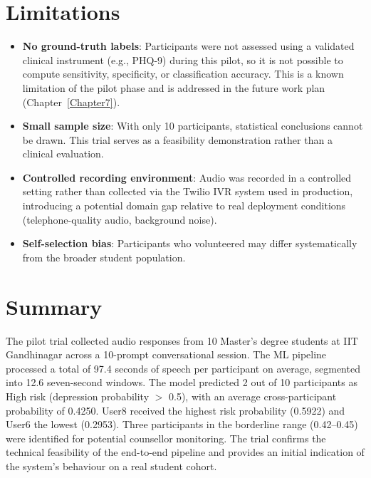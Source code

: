 \section{Limitations}

\begin{itemize}
    \item \textbf{No ground-truth labels}: Participants were not assessed using a validated clinical instrument (e.g., PHQ-9) during this pilot, so it is not possible to compute sensitivity, specificity, or classification accuracy. This is a known limitation of the pilot phase and is addressed in the future work plan (Chapter~\ref{Chapter7}).
    \item \textbf{Small sample size}: With only 10 participants, statistical conclusions cannot be drawn. This trial serves as a feasibility demonstration rather than a clinical evaluation.
    \item \textbf{Controlled recording environment}: Audio was recorded in a controlled setting rather than collected via the Twilio IVR system used in production, introducing a potential domain gap relative to real deployment conditions (telephone-quality audio, background noise).
    \item \textbf{Self-selection bias}: Participants who volunteered may differ systematically from the broader student population.
\end{itemize}

\section{Summary}

The pilot trial collected audio responses from 10 Master's degree students at IIT Gandhinagar across a 10-prompt conversational session. The ML pipeline processed a total of 97.4 seconds of speech per participant on average, segmented into 12.6 seven-second windows. The model predicted 2 out of 10 participants as High risk (depression probability $>$ 0.5), with an average cross-participant probability of 0.4250. User8 received the highest risk probability (0.5922) and User6 the lowest (0.2953). Three participants in the borderline range (0.42–0.45) were identified for potential counsellor monitoring. The trial confirms the technical feasibility of the end-to-end pipeline and provides an initial indication of the system's behaviour on a real student cohort.
